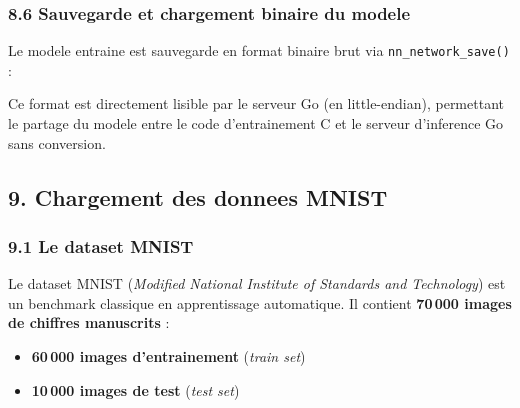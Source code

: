 \documentclass[
  letterpaper,
  DIV=11,
  numbers=noendperiod]{scrartcl}
\providecommand{\tightlist}{%
  \setlength{\itemsep}{0pt}\setlength{\parskip}{0pt}}
\begin{document}
\subsubsection{8.6 Sauvegarde et chargement binaire du modele}\label{sauvegarde-modele}

Le modele entraine est sauvegarde en format binaire brut via \texttt{nn\_network\_save()} :

\begin{center}
\end{center}

Ce format est directement lisible par le serveur Go (en little-endian), permettant le partage du modele entre le code d'entrainement C et le serveur d'inference Go sans conversion.

\subsection{9. Chargement des donnees MNIST}\label{chargement-mnist}

\subsubsection{9.1 Le dataset MNIST}\label{dataset-mnist}

Le dataset MNIST (\emph{Modified National Institute of Standards and Technology}) est un benchmark classique en apprentissage automatique. Il contient \textbf{70\,000 images de chiffres manuscrits} :
\begin{itemize}
\tightlist
\item \textbf{60\,000 images d'entrainement} (\emph{train set})
\item \textbf{10\,000 images de test} (\emph{test set})
\end{itemize}
\end{document}
